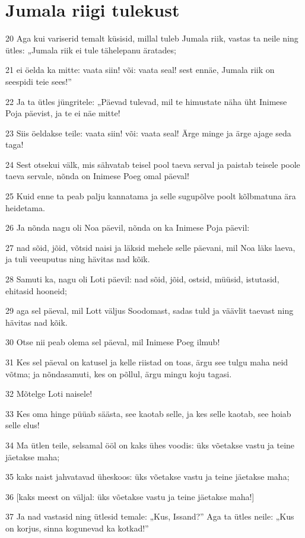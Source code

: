 \section*{Jumala riigi tulekust}

\par 20 Aga kui variserid temalt küsisid, millal tuleb Jumala riik, vastas ta neile ning ütles: „Jumala riik ei tule tähelepanu äratades;
\par 21 ei öelda ka mitte: vaata siin! või: vaata seal! sest ennäe, Jumala riik on seespidi teie sees!”
\par 22 Ja ta ütles jüngritele: „Päevad tulevad, mil te himustate näha üht Inimese Poja päevist, ja te ei näe mitte!
\par 23 Siis öeldakse teile: vaata siin! või: vaata seal! Ärge minge ja ärge ajage seda taga!
\par 24 Sest otsekui välk, mis sähvatab teisel pool taeva serval ja paistab teisele poole taeva servale, nõnda on Inimese Poeg omal päeval!
\par 25 Kuid enne ta peab palju kannatama ja selle sugupõlve poolt kõlbmatuna ära heidetama.
\par 26 Ja nõnda nagu oli Noa päevil, nõnda on ka Inimese Poja päevil:
\par 27 nad sõid, jõid, võtsid naisi ja läksid mehele selle päevani, mil Noa läks laeva, ja tuli veeuputus ning hävitas nad kõik.
\par 28 Samuti ka, nagu oli Loti päevil: nad sõid, jõid, ostsid, müüsid, istutasid, ehitasid hooneid;
\par 29 aga sel päeval, mil Lott väljus Soodomast, sadas tuld ja väävlit taevast ning hävitas nad kõik.
\par 30 Otse nii peab olema sel päeval, mil Inimese Poeg ilmub!
\par 31 Kes sel päeval on katusel ja kelle riistad on toas, ärgu see tulgu maha neid võtma; ja nõndasamuti, kes on põllul, ärgu mingu koju tagasi.
\par 32 Mõtelge Loti naisele!
\par 33 Kes oma hinge püüab säästa, see kaotab selle, ja kes selle kaotab, see hoiab selle elus!
\par 34 Ma ütlen teile, selsamal ööl on kaks ühes voodis: üks võetakse vastu ja teine jäetakse maha;
\par 35 kaks naist jahvatavad üheskoos: üks võetakse vastu ja teine jäetakse maha;
\par 36 [kaks meest on väljal: üks võetakse vastu ja teine jäetakse maha!]
\par 37 Ja nad vastasid ning ütlesid temale: „Kus, Issand?” Aga ta ütles neile: „Kus on korjus, sinna kogunevad ka kotkad!”


